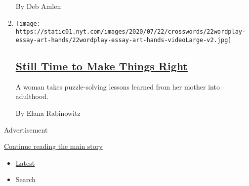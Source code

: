 \begin{enumerate}
  By Deb Amlen
\item
  \texttt{[image: https://static01.nyt.com/images/2020/07/22/crosswords/22wordplay-essay-art-hands/22wordplay-essay-art-hands-videoLarge-v2.jpg]}

  \hypertarget{still-time-to-make-things-right}{%
  \subsection{\texorpdfstring{\href{/2020/07/22/crosswords/crosswords-puzzles-essay-rabinowitz.html}{Still
  Time to Make Things
  Right}}{Still Time to Make Things Right}}\label{still-time-to-make-things-right}}

  A woman takes puzzle-solving lessons learned from her mother into
  adulthood.

  By Elana Rabinowitz
\end{enumerate}

Advertisement

\protect\hyperlink{after-mid1}{Continue reading the main story}

\begin{itemize}
\tightlist
\item
  \protect\hyperlink{stream-panel}{Latest}
\item
  Search
\end{itemize}

